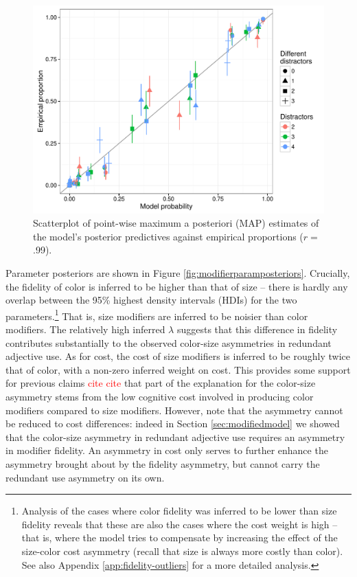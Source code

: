 \documentclass[11pt]{article}
\newcommand{\red}[1]{\textcolor{Red}{#1}}
\newcommand{\figref}[1]{Figure \ref{#1}}
\newcommand{\appref}[1]{Appendix \ref{#1}}
\newcommand{\sectionref}[1]{Section \ref{#1}}
\begin{document}
\begin{figure}
\centering
\includegraphics[width=.8\textwidth]{../../../models/1_basic_overinformativeness/results_bda/graphs/predictives-collapsed-fixed-reducedconditions}
\caption{Scatterplot of point-wise maximum a posteriori (MAP) estimates of the model's posterior predictives against empirical proportions ($r=$.99).}
\label{fig:modelexp1scatter}
\end{figure}

Parameter posteriors are shown in \figref{fig:modifierparamposteriors}. Crucially, the fidelity of color is inferred to be higher than that of size -- there is hardly any overlap between the 95\% highest density intervals (HDIs) for the two parameters.\footnote{Analysis of the cases where color fidelity was inferred to be lower than size fidelity reveals that these are also the cases where the cost weight is high -- that is, where the model tries to compensate by increasing the effect of the size-color cost asymmetry (recall that size is always more costly than color). See also \appref{app:fidelity-outliers} for a more detailed analysis.} That is, size modifiers are inferred to be noisier than color modifiers. The relatively high inferred $\lambda$ suggests that this difference in fidelity contributes substantially to the observed color-size asymmetries in redundant adjective use. As for cost, the cost of size modifiers is inferred to be roughly twice that of color, with a non-zero inferred weight on cost. This provides some support for previous claims \red{cite cite} that part of the explanation for the color-size asymmetry stems from the low cognitive cost involved in producing color modifiers compared to size modifiers. However, note that the asymmetry cannot be reduced to cost differences: indeed in \sectionref{sec:modifiedmodel} we showed that the color-size asymmetry in redundant adjective use requires an asymmetry in modifier fidelity. An asymmetry in cost only serves to further enhance the asymmetry brought about by the fidelity asymmetry, but cannot carry the redundant use asymmetry on its own.
\end{document}
